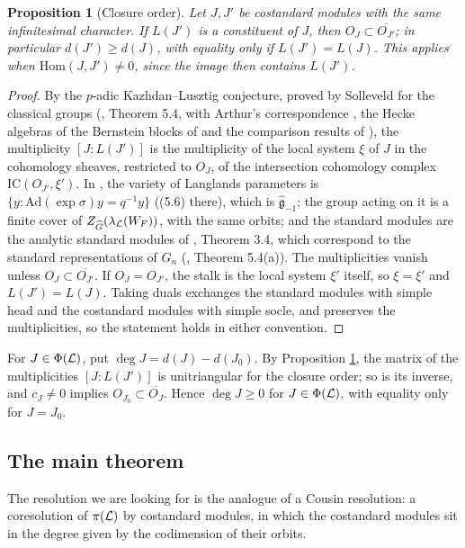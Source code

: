 \documentclass[a4paper,12pt,leqno]{amsart}
\theoremstyle{plain}
\newtheorem{prop}[thm]{Proposition}
\theoremstyle{definition}
\begin{document}
\begin{prop}[Closure order]\label{prop:closure} Let $J,J'$ be costandard modules with the same
infinitesimal character. If $L(J')$ is a constituent of $J$, then $O_J\subset\overline{O_{J'}}$; in
particular $d(J')\geq d(J)$, with equality only if $L(J')=L(J)$. This applies when
$\mathrm{Hom}(J,J')\neq0$, since the image then contains $L(J')$.
\end{prop}

\begin{proof}
By the $p$-adic Kazhdan--Lusztig conjecture, proved by Solleveld for the classical groups
(\cite{Sol25}, Theorem 5.4, with Arthur's correspondence \cite{Art13}, the Hecke algebras of the
Bernstein blocks of \cite{Hei17} and the comparison results of \cite{AMS22}), the multiplicity
$[J:L(J')]$ is the multiplicity of the local system $\xi$ of $J$ in the cohomology sheaves, restricted to
$O_J$, of the intersection cohomology complex $\mathrm{IC}(O_{J'},\xi')$. In \cite{Sol25}, the variety of
Langlands parameters is $\{y:\mathrm{Ad}(\exp\sigma)y=q^{-1}y\}$ ((5.6) there), which is
$\widehat{\mathfrak g}_{-1}$; the group acting on it is a finite cover of $Z_{\widehat
G}(\lambda_{\mathcal{L}}(W_F))$, with the same orbits; and the standard modules are the analytic standard
modules of \cite{Sol25}, Theorem 3.4, which correspond to the standard representations of $G_n$
(\cite{Sol25}, Theorem 5.4(a)). The multiplicities vanish unless $O_J\subset\overline{O_{J'}}$. If
$O_J=O_{J'}$, the stalk is the local system $\xi'$ itself, so $\xi=\xi'$ and $L(J')=L(J)$. Taking duals
exchanges the standard modules with simple head and the costandard modules with simple socle, and
preserves the multiplicities, so the statement holds in either convention.
\end{proof}

For $J\in\Phi(\mathcal{L})$, put $\deg J=d(J)-d(J_0)$. By Proposition \ref{prop:closure}, the matrix of
the multiplicities $[J:L(J')]$ is unitriangular for the closure order; so is its inverse, and
$c_J\neq0$ implies $O_{J_0}\subset\overline{O_J}$. Hence $\deg J\geq0$ for $J\in\Phi(\mathcal{L})$, with
equality only for $J=J_0$.

\subsection{The main theorem}
The resolution we are looking for is the analogue of a Cousin resolution: a coresolution of
$\pi(\mathcal{L})$ by costandard modules, in which the costandard modules sit in the degree given by the
codimension of their orbits.
\end{document}
